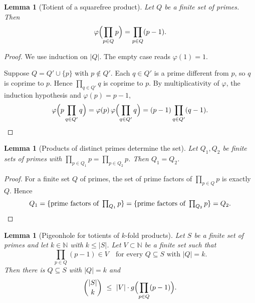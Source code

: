 \documentclass[11pt]{article}
\newtheorem{lemma}[theorem]{Lemma}
\theoremstyle{definition}
\theoremstyle{remark}
\begin{document}
\begin{lemma}[Totient of a squarefree product]\label{lem:totient_prod_primes}
Let $Q$ be a finite set of primes. Then
\[
\varphi\Bigl(\prod_{p\in Q}p\Bigr)=\prod_{p\in Q}(p-1).
\]
\end{lemma}

\begin{proof}
We use induction on $|Q|$. The empty case reads $\varphi(1)=1$.

Suppose $Q=Q'\cup\{p\}$ with $p\notin Q'$. Each $q\in Q'$ is a prime different from $p$, so $q$ is coprime to $p$. Hence $\prod_{q\in Q'}q$ is coprime to $p$. By multiplicativity of $\varphi$, the induction hypothesis and $\varphi(p)=p-1$,
\[
\varphi\Bigl(p\prod_{q\in Q'}q\Bigr)=\varphi(p)\,\varphi\Bigl(\prod_{q\in Q'}q\Bigr)=(p-1)\prod_{q\in Q'}(q-1). \qedhere
\]
\end{proof}

\begin{lemma}[Products of distinct primes determine the set]\label{lem:prod_primes_inj}
Let $Q_1,Q_2$ be finite sets of primes with $\prod_{p\in Q_1}p=\prod_{p\in Q_2}p$. Then $Q_1=Q_2$.
\end{lemma}

\begin{proof}
For a finite set $Q$ of primes, the set of prime factors of $\prod_{p\in Q}p$ is exactly $Q$. Hence
\[
Q_1=\{\text{prime factors of }\textstyle\prod_{Q_1}p\}=\{\text{prime factors of }\textstyle\prod_{Q_2}p\}=Q_2. \qedhere
\]
\end{proof}

\begin{lemma}[Pigeonhole for totients of $k$-fold products]\label{lem:exists_large_fiber}
Let $S$ be a finite set of primes and let $k\in\mathbb{N}$ with $k\le|S|$. Let $V\subset\mathbb{N}$ be a finite set such that
\[
\prod_{p\in Q}(p-1)\in V\quad\text{for every } Q\subseteq S \text{ with } |Q|=k.
\]
Then there is $Q\subseteq S$ with $|Q|=k$ and
\[
\binom{|S|}{k}\ \le\ |V|\cdot g\Bigl(\prod_{p\in Q}(p-1)\Bigr).
\]
\end{lemma}
\end{document}
